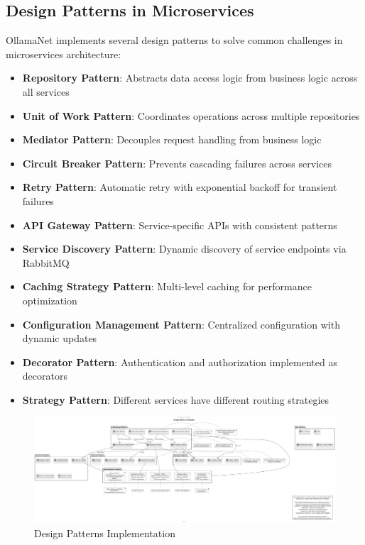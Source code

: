 \subsection{Design Patterns in Microservices}

OllamaNet implements several design patterns to solve common challenges in microservices architecture:

\begin{itemize}
    \item \textbf{Repository Pattern}: Abstracts data access logic from business logic across all services
    \item \textbf{Unit of Work Pattern}: Coordinates operations across multiple repositories
    \item \textbf{Mediator Pattern}: Decouples request handling from business logic
    \item \textbf{Circuit Breaker Pattern}: Prevents cascading failures across services
    \item \textbf{Retry Pattern}: Automatic retry with exponential backoff for transient failures
    \item \textbf{API Gateway Pattern}: Service-specific APIs with consistent patterns
    \item \textbf{Service Discovery Pattern}: Dynamic discovery of service endpoints via RabbitMQ
    \item \textbf{Caching Strategy Pattern}: Multi-level caching for performance optimization
    \item \textbf{Configuration Management Pattern}: Centralized configuration with dynamic updates
    \item \textbf{Decorator Pattern}: Authentication and authorization implemented as decorators
    \item \textbf{Strategy Pattern}: Different services have different routing strategies
\end{itemize}

\begin{figure}[p]
    \centering
    \includegraphics[width=\textwidth]{./Chapter02/figures/Design_Patterns.png}
    \caption{Design Patterns Implementation}
    \label{fig:design-patterns}
\end{figure}
\clearpage

